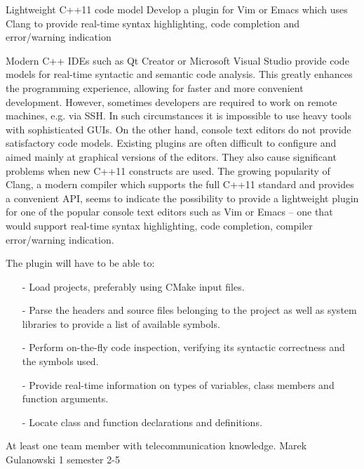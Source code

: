 \begin{project}
{Lightweight C++11 code model}
{Develop a plugin for Vim or Emacs which uses Clang to provide real-time
syntax highlighting, code completion and error/warning indication} 
{ 
Modern C++ IDEs such as Qt Creator or Microsoft Visual Studio provide code
models for real-time syntactic and semantic code analysis. This greatly enhances 
the programming experience, allowing for faster and more convenient development. 
However, sometimes developers are required to work on remote machines, e.g. via SSH. 
In such circumstances it is impossible to use heavy tools with sophisticated GUIs. 
On the other hand, console text editors do not provide satisfactory code models. 
Existing plugins are often difficult to configure and aimed mainly at graphical versions of the editors. 
They also cause significant problems when new C++11 constructs are used. The growing popularity of Clang,
a modern compiler which supports the full C++11 standard and provides a convenient API, seems to indicate 
the possibility to provide a lightweight plugin for one of the popular console text editors such as Vim or 
Emacs – one that would support real-time syntax highlighting, code completion, compiler error/warning indication. 
 
The plugin will have to be able to:
\begin{itemize}
	\item[-] Load projects, preferably using CMake input files.
	\item[-] Parse the headers and source files belonging to the project as well as
	system libraries to provide a list of available symbols.
	\item[-] Perform on-the-fly code inspection, verifying its syntactic correctness and the symbols used.
	\item[-] Provide real-time information on types of variables, class members and function arguments.
	\item[-] Locate class and function declarations and definitions.
\end{itemize} 
 }
{At least one team member with telecommunication knowledge.}
{Marek Gulanowski}
{1 semester}
{2-5}
\end{project}
